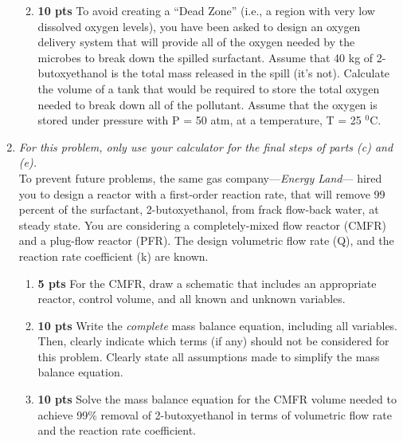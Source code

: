 \documentclass[12pt,letterpaper]{article}
\begin{document}
\begin{enumerate}
\begin{enumerate}
\vspace{3in}

\item \textbf{10 pts} To avoid creating a ``Dead Zone'' (i.e., a region with very low dissolved oxygen levels), you have been asked to design an oxygen delivery system that will provide all of the oxygen needed by the microbes to break down the spilled surfactant.  Assume that 40 kg of 2-butoxyethanol is the total mass released in the spill (it's not).  Calculate the volume of a tank that would be required to store the total oxygen needed  to break down all of the pollutant.  Assume that the oxygen is stored under pressure with P = 50 atm, at a temperature, T = 25 $^0$C.

\vspace{4in}

\end{enumerate} 

\item \emph{For this problem, only use your calculator for the final steps of parts (c) and (e).}\\
To prevent future problems, the same gas company---\emph{Energy Land}--- hired you to design a reactor with a first-order reaction rate, that will remove 99 percent of the surfactant, 2-butoxyethanol, from frack flow-back water, at steady state.  You are considering a completely-mixed flow reactor (CMFR) and a plug-flow reactor (PFR). The design volumetric flow rate (Q), and the reaction rate coefficient (k) are known.  

\begin{enumerate}
\item \textbf{5 pts} For the CMFR, draw a schematic that includes an appropriate reactor, control volume, and all known and unknown variables.


\vspace{2in}

\item \textbf{10 pts} Write the \emph{complete} mass balance equation, including all variables. Then, clearly indicate which terms (if any) should not be considered for this problem.  Clearly state all assumptions made to simplify the mass balance equation.
\vspace{2in}


\item \textbf{10 pts} Solve the mass balance equation for the CMFR volume needed to achieve 99\% removal of 2-butoxyethanol in terms of volumetric flow rate and the reaction rate coefficient.


\end{enumerate}
\end{enumerate}
\end{document}
